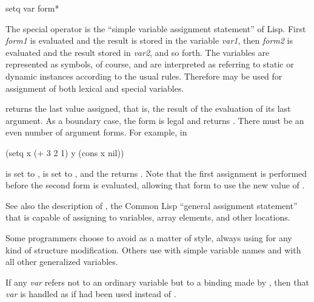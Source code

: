 \begin{defspec}
setq {var form}*

The special operator  is the
``simple variable assignment statement'' of Lisp.
First \emph{form1} is evaluated
and the result is stored in the variable \emph{var1}, then \emph{form2}
is evaluated and the result stored in \emph{var2}, and so forth.
The variables are represented as symbols, of course, and are interpreted
as referring to static or dynamic instances according to the usual rules.
Therefore  may be used for assignment of both lexical
and special variables.

 returns the last value assigned, that is, the result of the
evaluation of its last argument.
As a boundary case, the form  is legal and returns {\false}.
There must be an even number of argument forms.
For example, in
\begin{lisp}
(setq x (+ 3 2 1) y (cons x nil))
\end{lisp}
 is set to ,  is set to , and the 
returns .  Note that the first assignment is performed before
the second form is evaluated, allowing that form to
use the new value of .

See also the description of ,
the Common Lisp ``general assignment statement'' that is capable of assigning
to variables, array elements, and other locations.

Some programmers choose to avoid
 as a matter of style, always using  for any kind of
structure modification.  Others use  with simple variable names and
 with all other generalized variables.

If any \emph{var}
refers not to an ordinary variable but to a binding made by
, then that \emph{var} is handled as
if  had been used instead of .
\end{defspec}

